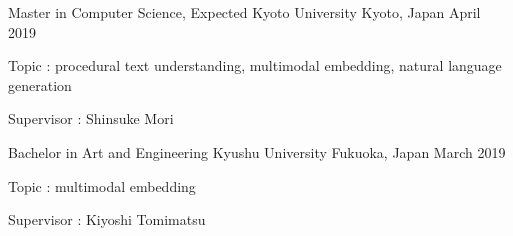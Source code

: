 
\begin{cventries}
  \cventry
    {Master in Computer Science, Expected} %
    {Kyoto University} %
    {Kyoto, Japan} %
    {April 2019} %
    {
      \begin{cvitems} %
         \item {Topic : procedural text understanding, multimodal embedding, natural language generation}
         \item {Supervisor : Shinsuke Mori}
      \end{cvitems}
    }
  \cventry
    {Bachelor in Art and Engineering} %
    {Kyushu University} %
    {Fukuoka, Japan} %
    {March 2019} %
    {
      \begin{cvitems} %
         \item {Topic : multimodal embedding}
         \item {Supervisor : Kiyoshi Tomimatsu}
      \end{cvitems}
    }
\end{cventries}
